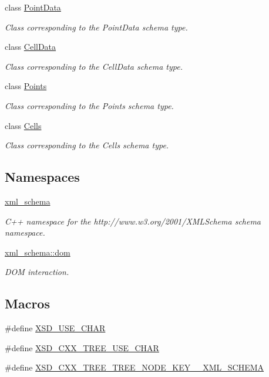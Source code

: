 \begin{DoxyCompactItemize}
class \hyperlink{classPointData}{Point\-Data}
\begin{DoxyCompactList}\small\item\em Class corresponding to the Point\-Data schema type. \end{DoxyCompactList}\item 
class \hyperlink{classCellData}{Cell\-Data}
\begin{DoxyCompactList}\small\item\em Class corresponding to the Cell\-Data schema type. \end{DoxyCompactList}\item 
class \hyperlink{classPoints}{Points}
\begin{DoxyCompactList}\small\item\em Class corresponding to the Points schema type. \end{DoxyCompactList}\item 
class \hyperlink{classCells}{Cells}
\begin{DoxyCompactList}\small\item\em Class corresponding to the Cells schema type. \end{DoxyCompactList}\end{DoxyCompactItemize}
\subsection*{Namespaces}
\begin{DoxyCompactItemize}
\item 
\hyperlink{namespacexml__schema}{xml\-\_\-schema}
\begin{DoxyCompactList}\small\item\em C++ namespace for the http\-://www.w3.\-org/2001/\-X\-M\-L\-Schema schema namespace. \end{DoxyCompactList}\item 
\hyperlink{namespacexml__schema_1_1dom}{xml\-\_\-schema\-::dom}
\begin{DoxyCompactList}\small\item\em D\-O\-M interaction. \end{DoxyCompactList}\end{DoxyCompactItemize}
\subsection*{Macros}
\begin{DoxyCompactItemize}
\item 
\#define \hyperlink{vtk-unstructured_8h_aee0a950eb1ff2461391d858c0cd254b7}{X\-S\-D\-\_\-\-U\-S\-E\-\_\-\-C\-H\-A\-R}
\item 
\#define \hyperlink{vtk-unstructured_8h_acef724a52414642ad3c9b7209702daf5}{X\-S\-D\-\_\-\-C\-X\-X\-\_\-\-T\-R\-E\-E\-\_\-\-U\-S\-E\-\_\-\-C\-H\-A\-R}
\item 
\#define \hyperlink{vtk-unstructured_8h_ab727c6f10de580ac0bb8f7395fa68895}{X\-S\-D\-\_\-\-C\-X\-X\-\_\-\-T\-R\-E\-E\-\_\-\-T\-R\-E\-E\-\_\-\-N\-O\-D\-E\-\_\-\-K\-E\-Y\-\_\-\-\_\-\-X\-M\-L\-\_\-\-S\-C\-H\-E\-M\-A}
\end{DoxyCompactItemize}
